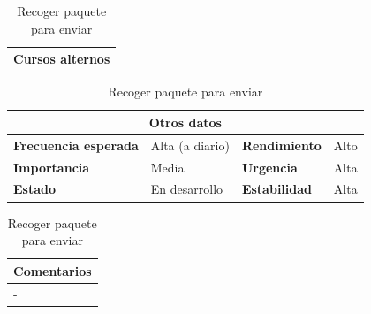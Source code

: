 \documentclass[12pt,spanish]{article}
\begin{document}
\begin{table}[H]
\vspace{1cm}

\begin{tabular}{|m{10pt}|m{7.15cm}|m{10pt}|m{7.15cm}|}
\hline
\multicolumn{4}{|m{16.2cm}|}{\textbf{Cursos alternos}} \\
\hline
\end{tabular}

\vspace{1cm}

\begin{tabular}{|m{3.72cm}|m{3.72cm}|m{3.72cm}|m{3.72cm}|}
\hline
\multicolumn{4}{|c|}{\textbf{Otros datos}} \\
\hline
\textbf{Frecuencia esperada} & Alta (a diario) & \textbf{Rendimiento} & Alto \\
\hline
\textbf{Importancia} & Media & \textbf{Urgencia} & Alta \\
\hline
\textbf{Estado} & En desarrollo & \textbf{Estabilidad} & Alta \\
\hline
\end{tabular}

\vspace{1cm}

\begin{tabular}{|m{16.2cm}|}
\hline
\textbf{Comentarios} \\
\hline
- \\
\hline
\end{tabular}

\caption{Recoger paquete para enviar}

\end{table}

\end{document}
